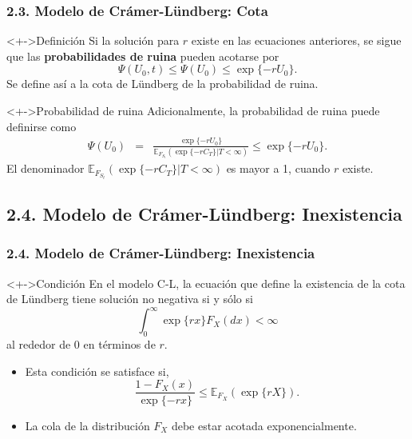 \documentclass[cjk,t,compress]{beamer}
\renewcommand{\exp}{\operatorname{\text{exp}}}
\begin{document}
\begin{frame}[fragile]
\frametitle{2.3. Modelo de Cr\'amer-L\"undberg: Cota}
\scriptsize  	

\vspace{0.1cm}
\begin{block}<+->{Definici\'on}
	\vspace{0.1cm}
	Si la soluci\'on para $r$ existe en las ecuaciones anteriores, se sigue que las {\bf probabilidades de ruina} pueden acotarse por
	\begin{equation}
	 \Psi(U_0,t) \leq \Psi(U_0) \leq \exp\{-r U_0\}.
	\end{equation}
	Se define as\'i a la cota de L\"undberg de la probabilidad de ruina.
\end{block}

\vspace{0.1cm}
\begin{block}<+->{Probabilidad de ruina}
	\vspace{0.1cm}
	Adicionalmente, la probabilidad de ruina puede definirse como
	\begin{eqnarray}
	\Psi(U_0) 
	  & = & \frac{\exp\{-r U_0\}}{\mathbb{E}_{F_{S_t}}\left(\exp\{-r C_T\} | T<\infty\right)}
	  \leq 
	  \exp\{-r U_0\}.
	\nonumber
	\end{eqnarray}
 	El denominador $\mathbb{E}_{F_{S_t}}(\exp\{-r C_T\}| T<\infty)$ es mayor a 1, cuando $r$ existe.
\end{block}


\end{frame}

%
%
\subsection{2.4. Modelo de Cr\'amer-L\"undberg: Inexistencia}

\begin{frame}[fragile]
\frametitle{2.4. Modelo de Cr\'amer-L\"undberg: Inexistencia}
\scriptsize  	

\vspace{0.1cm}
\begin{block}<+->{Condici\'on}
	\vspace{0.1cm}
	En el modelo C-L, la ecuaci\'on que define la existencia de la cota de L\"undberg tiene soluci\'on no negativa si y s\'olo si 
	\begin{equation}
	\int_{0}^{\infty}\exp\{rx\} F_X(dx)<\infty 
	\label{eq_tail}
	\end{equation}
	al rededor de $0$ en t\'erminos de $r$.

	\begin{itemize}
	  \item Esta condici\'on se satisface si,
		$$
		\frac{1-F_X(x)}{\exp\{-r x\}} \leq \mathbb{E}_{F_X}(\exp\{rX\}).
		$$

	  \item \textcolor{MyDarkGreen}{La cola de la distribuci\'on $F_X$ debe estar acotada exponencialmente.}
	\end{itemize}
\end{block}

\end{frame}
\end{document}
